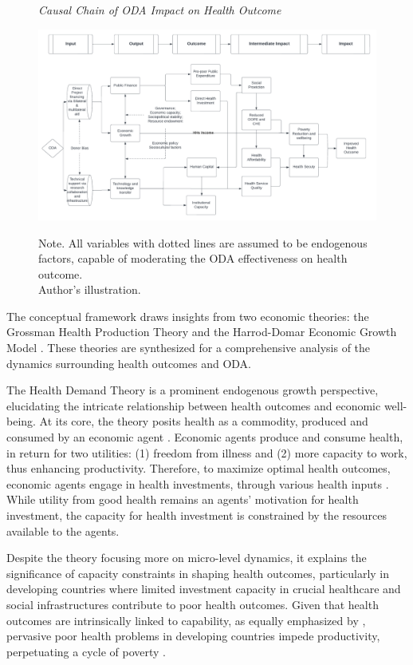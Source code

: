 \begin{figure}[ht]
\captionsetup{justification=justified,singlelinecheck=false}
\caption{\textit{Causal Chain of ODA Impact on Health Outcome}}
    \centering \includegraphics[width = \textwidth]{Figures/Frameworks/Causal Chain Graph for Thesis.pdf}
    \label{fig:Causal graph}
    \caption*{\footnotesize{Note. All variables with dotted lines are assumed to be endogenous factors, capable of moderating the ODA effectiveness on health outcome.\\ Author's illustration.}}
\end{figure}

The conceptual framework draws insights from two economic theories: the Grossman Health Production Theory \parencite{grossman_concept_1972} and the Harrod-Domar Economic Growth Model \parencite{asimakopulos1986harrod}. These theories are synthesized for a comprehensive analysis of the dynamics surrounding health outcomes and ODA.

The Health Demand Theory is a prominent endogenous growth perspective, elucidating the intricate relationship between health outcomes and economic well-being. At its core, the theory posits health as a commodity, produced and consumed by an economic agent \parencite{grossman_concept_1972}. Economic agents produce and consume health, in return for two utilities: (1) freedom from illness and (2) more capacity to work, thus enhancing productivity. Therefore, to maximize optimal health outcomes, economic agents engage in health investments, through various health inputs \parencite{grossman_concept_1972}. While utility from good health remains an agents' motivation for health investment, the capacity for health investment is constrained by the resources available to the agents.

Despite the theory focusing more on micro-level dynamics, it explains the significance of capacity constraints in shaping health outcomes, particularly in developing countries where limited investment capacity in crucial healthcare and social infrastructures contribute to poor health outcomes. Given that health outcomes are intrinsically linked to capability, as equally emphasized by \textcite{sen_health_1998}, pervasive poor health problems in developing countries impede productivity, perpetuating a cycle of poverty \parencite{staicu2017study}.

